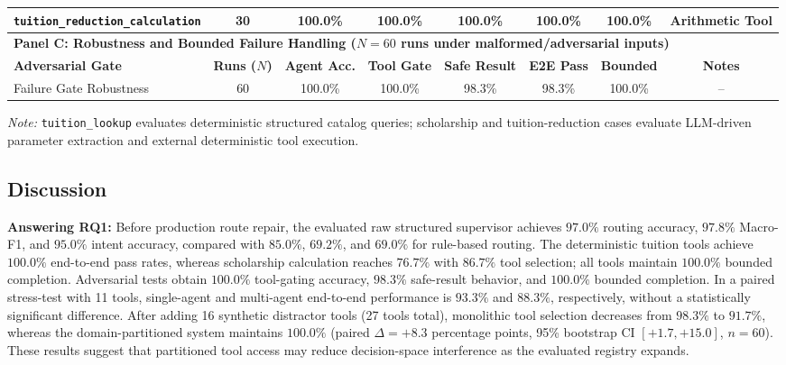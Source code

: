 \begin{table}[!htbp]
{\begin{tabular}{lccccccc}
\texttt{tuition\_reduction\_calculation}& 30 & 100.0\% & 100.0\% & 100.0\% & 100.0\% & 100.0\% & Arithmetic Tool \\
\midrule
\multicolumn{8}{l}{\textbf{Panel C: Robustness and Bounded Failure Handling ($N=60$ runs under malformed/adversarial inputs)}} \\
\midrule
\textbf{Adversarial Gate} & \textbf{Runs ($N$)} & \textbf{Agent Acc.} & \textbf{Tool Gate} & \textbf{Safe Result} & \textbf{E2E Pass} & \textbf{Bounded} & \textbf{Notes} \\
\midrule
Failure Gate Robustness    & 60 & 100.0\% & 100.0\% & 98.3\% & 98.3\% & 100.0\% & -- \\
\bottomrule
\end{tabular}
}
\medskip
\parbox{\columnwidth}{\footnotesize\emph{Note:} \texttt{tuition\_lookup} evaluates deterministic structured catalog queries; scholarship and tuition-reduction cases evaluate LLM-driven parameter extraction and external deterministic tool execution.}
\end{table}

\subsection{Discussion}
\label{sec:discussion}

\textbf{Answering RQ1:} Before production route repair, the evaluated raw structured supervisor achieves $97.0\%$ routing accuracy, $97.8\%$ Macro-F1, and $95.0\%$ intent accuracy, compared with $85.0\%$, $69.2\%$, and $69.0\%$ for rule-based routing. The deterministic tuition tools achieve $100.0\%$ end-to-end pass rates, whereas scholarship calculation reaches $76.7\%$ with $86.7\%$ tool selection; all tools maintain $100.0\%$ bounded completion. Adversarial tests obtain $100.0\%$ tool-gating accuracy, $98.3\%$ safe-result behavior, and $100.0\%$ bounded completion. In a paired stress-test with 11 tools, single-agent and multi-agent end-to-end performance is $93.3\%$ and $88.3\%$, respectively, without a statistically significant difference. After adding 16 synthetic distractor tools (27 tools total), monolithic tool selection decreases from $98.3\%$ to $91.7\%$, whereas the domain-partitioned system maintains $100.0\%$ (paired $\Delta=+8.3$ percentage points, 95\% bootstrap CI $[+1.7,+15.0]$, $n=60$). These results suggest that partitioned tool access may reduce decision-space interference as the evaluated registry expands.

